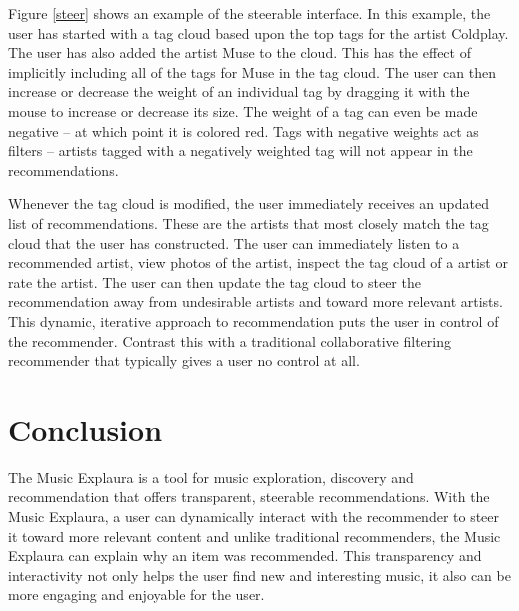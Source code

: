 \documentclass{article}
\begin{document}
Figure \ref{steer} shows an example of the steerable
interface.  In this example, the user has started with a tag cloud based
upon the top tags for the artist Coldplay.  The user has also
added the artist Muse to the cloud. This has the effect
of implicitly including all of the tags for Muse in the tag cloud.  The user can
then increase or decrease the weight of an individual tag by
dragging it with the mouse to increase or decrease its size.  The weight of a
tag can even be made negative -- at which point it is colored red.
Tags with negative weights act as filters --
artists tagged with a negatively weighted tag will not appear in
the recommendations.  

Whenever the tag cloud is modified, the user
immediately receives an updated list of recommendations.  These are
the artists that most closely match the tag cloud that the user
has constructed. The user can immediately listen to a recommended artist, view
photos of the artist, inspect the tag cloud of a artist or rate the artist.
The user can then update the tag cloud to steer the recommendation 
away from undesirable artists and toward more relevant artists. This
dynamic, iterative approach to recommendation puts the user in control
of the recommender. Contrast this with a traditional collaborative
filtering recommender that typically gives a user no control at all.

\section{Conclusion}
The Music Explaura is a tool for music exploration, discovery and
recommendation that offers transparent, steerable recommendations. With
the Music Explaura, a user can dynamically interact with the
recommender to steer it toward more relevant content and unlike
traditional recommenders, the Music Explaura 
can explain why an item was recommended.
This transparency and interactivity not only helps the user find 
new and interesting music, it also can be more engaging and enjoyable 
for the user.
\end{document}
